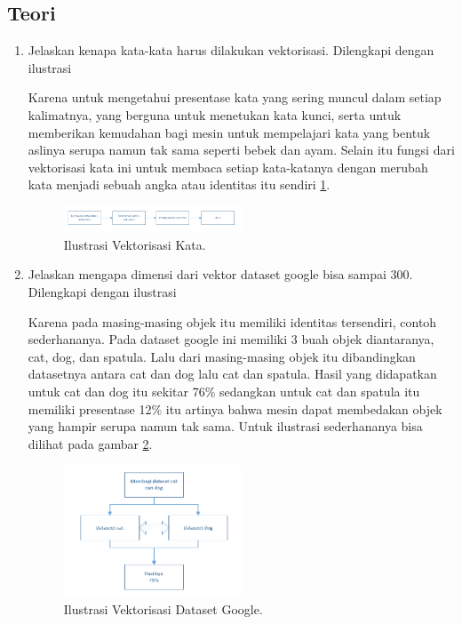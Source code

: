 \subsection{Teori}
\begin{enumerate}
\item Jelaskan kenapa kata-kata harus dilakukan vektorisasi. Dilengkapi dengan ilustrasi \par
Karena untuk mengetahui presentase kata yang sering muncul dalam setiap kalimatnya, yang berguna untuk menetukan kata kunci, serta untuk memberikan kemudahan bagi mesin untuk mempelajari kata yang bentuk aslinya serupa namun tak sama seperti bebek dan ayam. Selain itu fungsi dari vektorisasi kata ini untuk membaca setiap kata-katanya dengan merubah kata menjadi sebuah angka atau identitas itu sendiri \ref{vek1}.
		\begin{figure}[!htbp]
		\centerline{\includegraphics[width=0.5\textwidth]{figures/im/vek1.png}}
		\caption{Ilustrasi Vektorisasi Kata.}
		\label{vek1}
		\end{figure}

\item Jelaskan mengapa dimensi dari vektor dataset google bisa sampai 300. Dilengkapi dengan ilustrasi \par
Karena pada masing-masing objek itu memiliki identitas tersendiri, contoh sederhananya. Pada dataset google ini memiliki 3 buah objek diantaranya, cat, dog, dan spatula. Lalu dari masing-masing objek itu dibandingkan datasetnya antara cat dan dog lalu cat dan spatula. Hasil yang didapatkan untuk cat dan dog itu sekitar 76\% sedangkan untuk cat dan spatula itu memiliki presentase 12\% itu artinya bahwa mesin dapat membedakan objek yang hampir serupa namun tak sama. Untuk ilustrasi sederhananya bisa dilihat pada gambar \ref{vek2}.
		\begin{figure}[!htbp]
		\centerline{\includegraphics[width=0.5\textwidth]{figures/im/vek2.png}}
		\caption{Ilustrasi Vektorisasi Dataset Google.}
		\label{vek2}
		\end{figure}


\end{enumerate}
